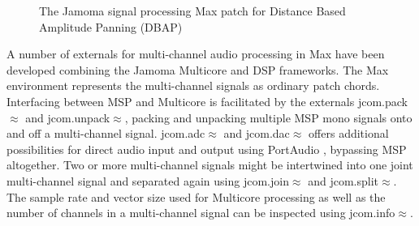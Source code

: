 \documentclass[twoside,a4paper]{article}
\begin{document}
\begin{figure}[!t]
\centering
{} \hspace{0.4cm}
\caption{The Jamoma signal processing Max patch for Distance Based Amplitude Panning (DBAP)}
\label{fig:max-before-after}
\end{figure}

A number of externals for multi-channel audio processing in Max have been developed combining the Jamoma Multicore and DSP frameworks. 
The Max environment represents the multi-channel signals as ordinary patch chords. 
Interfacing between MSP and Multicore is facilitated by the externals jcom.pack$\approx$ and jcom.unpack$\approx$, packing and unpacking multiple MSP mono signals onto and off a multi-channel signal. 
jcom.adc$\approx$ and jcom.dac$\approx$ offers additional possibilities for direct audio input and output using PortAudio \cite{Bencina:2003}, bypassing MSP altogether. 
Two or more multi-channel signals might be intertwined into one joint multi-channel signal and separated again using jcom.join$\approx$ and jcom.split$\approx$.
The sample rate and vector size used for Multicore processing as well as the number of channels in a multi-channel signal can be inspected using jcom.info$\approx$.
\end{document}
